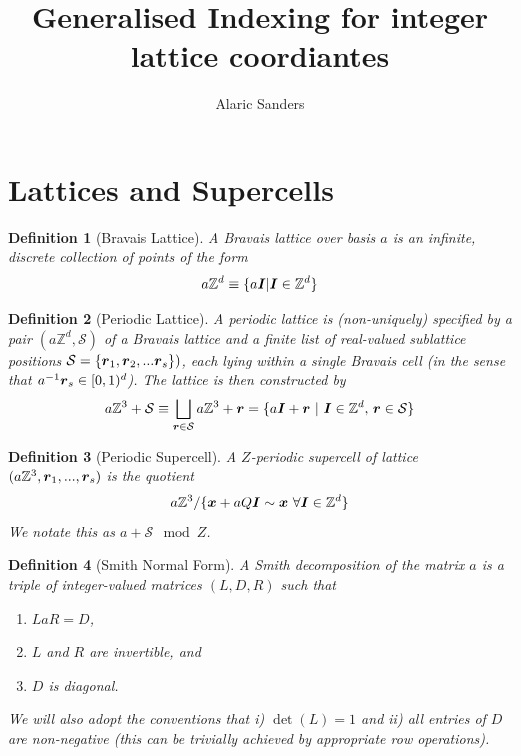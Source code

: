 \documentclass[12pt,a4paper]{article}
\title{Generalised Indexing for integer lattice coordiantes}
\author{Alaric Sanders}
\newtheorem{definition}{Definition}
\newcommand\bs[1]{\ensuremath\boldsymbol{#1}}
\begin{document}
\maketitle

\section{Lattices and Supercells} 

\begin{definition}[Bravais Lattice]
    A Bravais lattice over basis $a$ is an infinite, discrete collection of points of the form
    \[
        a \mathbb{Z}^d \equiv \{ a \bs{I} | \bs{I} \in \mathbb{Z}^d \}
    \]
\end{definition}

\begin{definition}[Periodic Lattice]
    A periodic lattice is (non-uniquely) specified by a pair $(a\mathbb{Z}^d, \mathcal{S})$ of a Bravais lattice and a finite list of real-valued sublattice positions $\mathcal{S} = \{\bs{r}_1, \bs{r}_2, ... \bs{r}_s\} )$, each lying within a single Bravais cell (in the sense that $a^{-1} \bs{r}_s \in [0,1)^d$). The lattice is then constructed by
    $$ a\mathbb{Z}^3 + \mathcal{S} \equiv \bigsqcup_{\bs{r} \in \mathcal{S}} a \mathbb{Z}^3 + \bs{r} = \{ a \bs{I} + \bs{r} ~|~ \bs{I} \in \mathbb{Z}^d,\,\bs{r} \in \mathcal{S} \} $$
\end{definition}

\begin{definition}[Periodic Supercell]
    A $Z$-periodic supercell of lattice $(a \mathbb{Z}^3, {\bs{r}_1,...,\bs{r}_s})$ is the quotient
    \[
        a \mathbb{Z}^3 / \{ \bs{x} + aQ \bs{I} \sim \bs{x} ~ \forall \bs{I} \in \mathbb{Z}^d \}
    \]
    We notate this as $a + \mathcal{S} \mod Z$.
\end{definition}

\begin{definition}[Smith Normal Form]
    A Smith decomposition of the matrix $a$ is a triple of integer-valued matrices $(L,D,R)$ such that
    \begin{enumerate}
        \item $L a R = D$,
        \item $L$ and $R$ are invertible, and
        \item $D$ is diagonal.
    \end{enumerate}
    We will also adopt the conventions that i) $\det(L) = 1$ and ii) all entries of $D$ are non-negative (this can be trivially achieved by appropriate row operations).
\end{definition}
\end{document}
